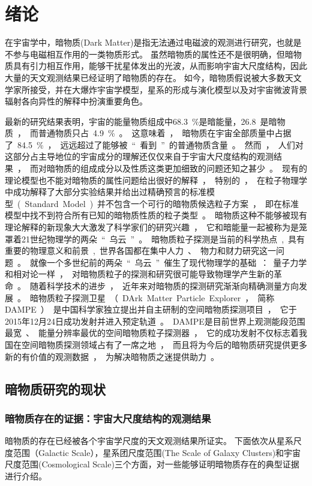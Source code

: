 \chapter{绪论}
\label{ch:introduction}

在宇宙学中，暗物质(Dark Matter)是指无法通过电磁波的观测进行研究，也就是不参与电磁相互作用的一类物质形式。
虽然暗物质的属性还不是很明确，但暗物质具有引力相互作用，能够干扰星体发出的光波，从而影响宇宙大尺度结构，因此大量的天文观测结果已经证明了暗物质的存在。
如今，暗物质假说被大多数天文学家所接受，并在大爆炸宇宙学模型，星系的形成与演化模型以及对宇宙微波背景辐射各向异性的解释中扮演重要角色。

最新的研究结果表明\parencite{planck_collaboration_planck_2014}，宇宙的能量物质组成中\SI{68.3}{\percent}是暗能量，\SI{26.8}是暗物质，而普通物质只占\SI{4.9}{\percent}。这意味着，暗物质在宇宙全部质量中占据了\SI{84.5}{\percent}，远远超过了能够被“看到”的普通物质含量。
然而，人们对这部分占主导地位的宇宙成分的理解还仅仅来自于宇宙大尺度结构的观测结果，而对暗物质的组成成分以及性质这类更加细致的问题还知之甚少。
现有的理论模型也不能对暗物质的属性问题给出很好的解释，特别的，在粒子物理学中成功解释了大部分实验结果并给出过精确预言的标准模型(Standard Model)并不包含一个可行的暗物质候选粒子方案，即在标准模型中找不到符合所有已知的暗物质性质的粒子类型。
暗物质这种不能够被现有理论解释的新现象大大激发了科学家们的研究兴趣，它和暗能量一起被称为是笼罩着21世纪物理学的两朵“乌云”。
暗物质粒子探测是当前的科学热点, 具有重要的物理意义和前景, 世界各国都在集中人力、物力和财力研究这一问题。
就像一个多世纪前的两朵“乌云”催生了现代物理学的基础：量子力学和相对论一样，对暗物质粒子的探测和研究很可能导致物理学产生新的革命。

随着科学技术的进步，近年来对暗物质的探测研究渐渐向精确测量方向发展。
暗物质粒子探测卫星（DArk Matter Particle Explorer，简称DAMPE）是中国科学家独立提出并自主研制的空间暗物质探测项目，它于2015年12月24日成功发射并进入预定轨道。
DAMPE是目前世界上观测能段范围最宽、能量分辨率最优的空间暗物质粒子探测器，它的成功发射不仅标志着我国在空间暗物质探测领域占有了一席之地，而且将为今后的暗物质研究提供更多新的有价值的观测数据，为解决暗物质之迷提供助力。

\section{暗物质研究的现状}
\subsection{暗物质存在的证据：宇宙大尺度结构的观测结果}
暗物质的存在已经被各个宇宙学尺度的天文观测结果所证实。
下面依次从星系尺度范围（Galactic Scale），星系团尺度范围(The Scale of Galaxy Clusters)和宇宙尺度范围(Cosmological Scale)三个方面，对一些能够证明暗物质存在的典型证据进行介绍。


